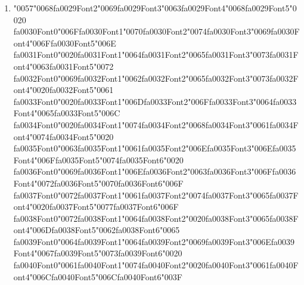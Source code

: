 \documentclass[11pt]{article}
\begin{document}
\begin{enumerate}[label=Q\arabic*., leftmargin=*]
\item {\char"0057}{\char"0068}{\csname fa0029Font2\endcsname\char"0069}{\csname fa0029Font3\endcsname\char"0063}{\csname fa0029Font4\endcsname\char"0068}{\csname fa0029Font5\endcsname\char"0020} {\csname fa0030Font0\endcsname\char"006F}{\csname fa0030Font1\endcsname\char"0070}{\csname fa0030Font2\endcsname\char"0074}{\csname fa0030Font3\endcsname\char"0069}{\csname fa0030Font4\endcsname\char"006F}{\csname fa0030Font5\endcsname\char"006E} {\csname fa0031Font0\endcsname\char"0020}{\csname fa0031Font1\endcsname\char"0064}{\csname fa0031Font2\endcsname\char"0065}{\csname fa0031Font3\endcsname\char"0073}{\csname fa0031Font4\endcsname\char"0063}{\csname fa0031Font5\endcsname\char"0072} {\csname fa0032Font0\endcsname\char"0069}{\csname fa0032Font1\endcsname\char"0062}{\csname fa0032Font2\endcsname\char"0065}{\csname fa0032Font3\endcsname\char"0073}{\csname fa0032Font4\endcsname\char"0020}{\csname fa0032Font5\endcsname\char"0061} {\csname fa0033Font0\endcsname\char"0020}{\csname fa0033Font1\endcsname\char"006D}{\csname fa0033Font2\endcsname\char"006F}{\csname fa0033Font3\endcsname\char"0064}{\csname fa0033Font4\endcsname\char"0065}{\csname fa0033Font5\endcsname\char"006C} {\csname fa0034Font0\endcsname\char"0020}{\csname fa0034Font1\endcsname\char"0074}{\csname fa0034Font2\endcsname\char"0068}{\csname fa0034Font3\endcsname\char"0061}{\csname fa0034Font4\endcsname\char"0074}{\csname fa0034Font5\endcsname\char"0020} {\csname fa0035Font0\endcsname\char"0063}{\csname fa0035Font1\endcsname\char"0061}{\csname fa0035Font2\endcsname\char"006E}{\csname fa0035Font3\endcsname\char"006E}{\csname fa0035Font4\endcsname\char"006F}{\csname fa0035Font5\endcsname\char"0074}{\csname fa0035Font6\endcsname\char"0020} {\csname fa0036Font0\endcsname\char"0069}{\csname fa0036Font1\endcsname\char"006E}{\csname fa0036Font2\endcsname\char"0063}{\csname fa0036Font3\endcsname\char"006F}{\csname fa0036Font4\endcsname\char"0072}{\csname fa0036Font5\endcsname\char"0070}{\csname fa0036Font6\endcsname\char"006F} {\csname fa0037Font0\endcsname\char"0072}{\csname fa0037Font1\endcsname\char"0061}{\csname fa0037Font2\endcsname\char"0074}{\csname fa0037Font3\endcsname\char"0065}{\csname fa0037Font4\endcsname\char"0020}{\csname fa0037Font5\endcsname\char"0077}{\csname fa0037Font6\endcsname\char"006F} {\csname fa0038Font0\endcsname\char"0072}{\csname fa0038Font1\endcsname\char"0064}{\csname fa0038Font2\endcsname\char"0020}{\csname fa0038Font3\endcsname\char"0065}{\csname fa0038Font4\endcsname\char"006D}{\csname fa0038Font5\endcsname\char"0062}{\csname fa0038Font6\endcsname\char"0065} {\csname fa0039Font0\endcsname\char"0064}{\csname fa0039Font1\endcsname\char"0064}{\csname fa0039Font2\endcsname\char"0069}{\csname fa0039Font3\endcsname\char"006E}{\csname fa0039Font4\endcsname\char"0067}{\csname fa0039Font5\endcsname\char"0073}{\csname fa0039Font6\endcsname\char"0020} {\csname fa0040Font0\endcsname\char"0061}{\csname fa0040Font1\endcsname\char"0074}{\csname fa0040Font2\endcsname\char"0020}{\csname fa0040Font3\endcsname\char"0061}{\csname fa0040Font4\endcsname\char"006C}{\csname fa0040Font5\endcsname\char"006C}{\csname fa0040Font6\endcsname\char"003F}


\end{enumerate}
\end{document}
